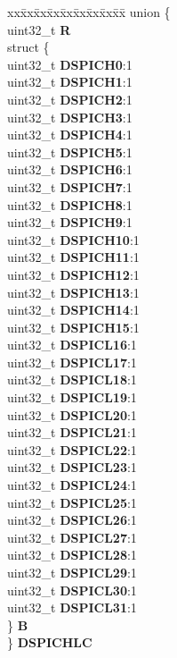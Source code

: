 \begin{DoxyCompactItemize}
\begin{tabbing}
\end{tabbing}\item 
\mbox{\label{structSIU__tag_a0dcaf09ddcca980bcd8ec4ce9612941d}} 
\begin{tabbing}
xx\=xx\=xx\=xx\=xx\=xx\=xx\=xx\=xx\=\kill
union \{\\
\>uint32\_t {\bfseries R}\\
\>struct \{\\
\>\>uint32\_t {\bfseries DSPICH0}:1\\
\>\>uint32\_t {\bfseries DSPICH1}:1\\
\>\>uint32\_t {\bfseries DSPICH2}:1\\
\>\>uint32\_t {\bfseries DSPICH3}:1\\
\>\>uint32\_t {\bfseries DSPICH4}:1\\
\>\>uint32\_t {\bfseries DSPICH5}:1\\
\>\>uint32\_t {\bfseries DSPICH6}:1\\
\>\>uint32\_t {\bfseries DSPICH7}:1\\
\>\>uint32\_t {\bfseries DSPICH8}:1\\
\>\>uint32\_t {\bfseries DSPICH9}:1\\
\>\>uint32\_t {\bfseries DSPICH10}:1\\
\>\>uint32\_t {\bfseries DSPICH11}:1\\
\>\>uint32\_t {\bfseries DSPICH12}:1\\
\>\>uint32\_t {\bfseries DSPICH13}:1\\
\>\>uint32\_t {\bfseries DSPICH14}:1\\
\>\>uint32\_t {\bfseries DSPICH15}:1\\
\>\>uint32\_t {\bfseries DSPICL16}:1\\
\>\>uint32\_t {\bfseries DSPICL17}:1\\
\>\>uint32\_t {\bfseries DSPICL18}:1\\
\>\>uint32\_t {\bfseries DSPICL19}:1\\
\>\>uint32\_t {\bfseries DSPICL20}:1\\
\>\>uint32\_t {\bfseries DSPICL21}:1\\
\>\>uint32\_t {\bfseries DSPICL22}:1\\
\>\>uint32\_t {\bfseries DSPICL23}:1\\
\>\>uint32\_t {\bfseries DSPICL24}:1\\
\>\>uint32\_t {\bfseries DSPICL25}:1\\
\>\>uint32\_t {\bfseries DSPICL26}:1\\
\>\>uint32\_t {\bfseries DSPICL27}:1\\
\>\>uint32\_t {\bfseries DSPICL28}:1\\
\>\>uint32\_t {\bfseries DSPICL29}:1\\
\>\>uint32\_t {\bfseries DSPICL30}:1\\
\>\>uint32\_t {\bfseries DSPICL31}:1\\
\>\} {\bfseries B}\\
\} {\bfseries DSPICHLC}\\


\end{tabbing}
\end{DoxyCompactItemize}
